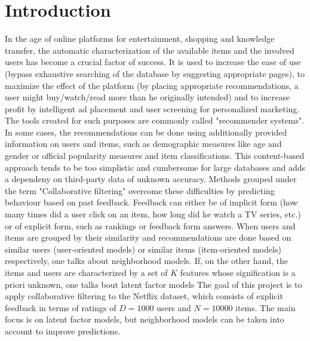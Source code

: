 \section{Introduction}

In the age of online platforms for entertainment, shopping and 
knowledge transfer, the automatic characterization of the available items and
the involved users has become a
crucial factor of success. It is used to increase the ease of use 
(bypass exhaustive searching of the database by suggesting appropriate pages),
to maximize the effect of the platform (by placing appropriate recommendations,
a user might buy/watch/read more than he originally intended) and to increase
profit by intelligent ad placement and user screening for personalized marketing.
The tools created for such purposes are commonly called "recommender
systems".
In some cases, the recommendations can be done using additionally provided
information on users and items, such as demographic measures like age and gender or official
popularity measures and item classifications. This content-based approach tends
to be too simplistic and cumbersome for large databases and adds a dependeny
on third-party data of unknown accuracy.  
Methods grouped under the term "Collaborative filtering" overcome these
difficulties by predicting behaviour based on past feedback. Feedback can either be
of implicit form (how many times did a user click on an item, how long did he
watch a TV series, etc.) or of explicit form, such as rankings or feedback form
answers. \cite{Hu2008} 
When users and items are grouped by their similarity and recommendations are
done based on similar users (user-oriented models) or similar items
(item-oriented models) respectively, one talks about neighborhood models. 
If, on the other hand, the items and users are characterized by a set of $K$ features
whose signification is a priori unknown, one talks bout latent factor models  
The goal of this project is to apply collaborative filtering to the Netflix
dataset, which consists of explicit feedback in terms of ratings of $D=1000$ users
and $N=10000$ items. The main focus is on latent factor models, but neighborhood
models can be taken into account to improve predictions.


